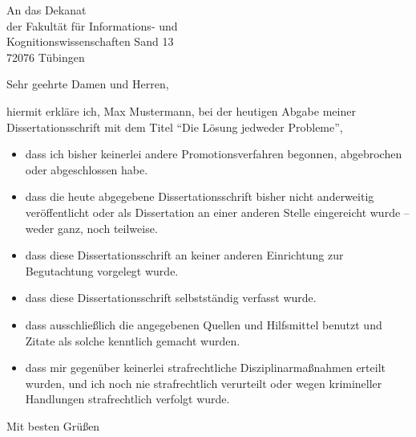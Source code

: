 \documentclass[11pt,german]{wsi_zbit_brief}
\author{\name}
\date{\today}
\newcommand{\name}{Max Mustermann}
\begin{document}
\date{\today}
\subject{Antrag auf Zulassung zum Promotionsverfahren}

\begin{letter}{An das Dekanat\\der Fakult\"at f\"ur Informations- und\\
Kognitionswissenschaften Sand 13\\[2ex]72076 T\"ubingen}
\opening{Sehr geehrte Damen und Herren,}

hiermit erkl\"are ich, \name, bei der heutigen Abgabe meiner
Dissertationsschrift mit dem Titel "`Die L\"osung jedweder Probleme"',
\begin{itemize}
 \item dass ich bisher keinerlei andere
       Promotionsverfahren begonnen, abgebrochen oder abgeschlossen habe.
 \item dass die heute abgegebene Dissertationsschrift bisher nicht
       anderweitig ver\"offentlicht oder als Dissertation an einer anderen
       Stelle eingereicht wurde -- weder ganz, noch teilweise.
 \item dass diese Dissertationsschrift an keiner anderen Einrichtung zur
       Begutachtung vorgelegt wurde.
 \item dass diese Dissertationsschrift selbstst\"andig verfasst wurde.
 \item dass ausschlie{\ss}lich die angegebenen Quellen und Hilfsmittel benutzt
       und Zitate als solche kenntlich gemacht wurden.
 \item dass mir gegen\"uber keinerlei strafrechtliche Disziplinarma{\ss}nahmen
       erteilt wurden, und ich noch nie strafrechtlich verurteilt oder wegen
       krimineller Handlungen strafrechtlich verfolgt wurde.
\end{itemize}

\closing{Mit besten Gr\"u{\ss}en}
\vfill
\end{letter}
\end{document}
